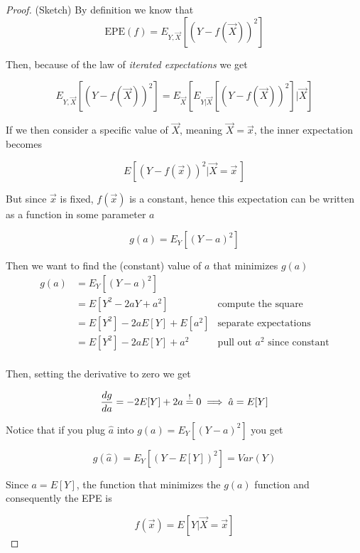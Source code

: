     \begin{proof}
      (Sketch) By definition we know that
      $$\text{EPE}(f) = E_{Y,\vec{X}}[(Y-f(\vec{X}))^2]$$

      Then, because of the law of \textit{iterated expectations} we get

      $$E_{Y,\vec{X}}[(Y-f(\vec{X}))^2] =
      E_{\vec{X}}[E_{Y|\vec{X}}[(Y-f(\vec{X}))^2]| \vec{X}]$$
      
      If we then consider a specific value of $\vec{X}$, meaning $\vec{X} =
      \vec{x}$, the inner expectation becomes 
      
      $$E[(Y-f(\vec{x}))^2 | \vec{X} = \vec{x}\,] $$
      
      But since $\vec{x}$ is fixed, $f(\vec{x})$ is a constant, hence this
      expectation can be written as a function in some parameter $a$

      $$g(a) = E_{Y}[(Y-a)^2]$$

      Then we want to find the (constant) value of $a$ that minimizes $g(a)$
      \begin{align*}
        g(a) & = E_{Y}[(Y-a)^2]               & \\
             & = E[Y^2 - 2aY + a^2]           & \text{compute the square} \\
             & = E[Y^2] -2aE[Y] + E[a^2]      & \text{separate expectations} \\
             & = E[Y^2] -2aE[Y] + a^2         & \text{pull out } a^2 \text{ since constant} \\
      \end{align*}

      Then, setting the derivative to zero we get 

      $$\frac{dg}{da} = -2E[Y] + 2a \overset{!}{=} 0 \implies \hat{a} = E[Y]$$

      Notice that if you plug $\hat{a}$ into $g(a) = E_{Y}[(Y-a)^2]$ you get

      $$g(\hat{a}) = E_{Y}[(Y-E[Y])^2] = Var(Y)$$
      
      Since $a = E[Y]$, the function that minimizes the $ g(a) $ function and
      consequently the EPE is 

      $$f(\vec{x}) = E[Y|\vec{X} = \vec{x}]$$
    \end{proof}

